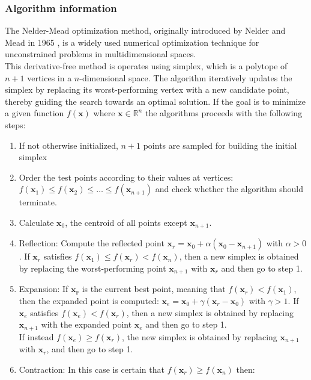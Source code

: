 \subsubsection{Algorithm information}
The Nelder-Mead optimization method, originally introduced by Nelder and Mead in 1965 \cite{NelderMeads}, is a widely used numerical optimization technique for unconstrained problems in multidimensional spaces. \\
This derivative-free method is operates using simplex, which is a polytope of $n+1$ vertices in a $n$-dimensional space.
The algorithm iteratively updates the simplex by replacing its worst-performing vertex with a new candidate point, thereby guiding the search towards an optimal solution. 
If the goal is to minimize a given function $f(\mathbf{x})$ where $\mathbf{x} \in \mathbb{R}^n$ the algorithms proceeds with the following steps:\begin{enumerate}
    \item If not otherwise initialized, $n+1$ points are sampled for building the initial simplex
    \item Order the test points according to their values at vertices: $f(\mathbf{x}_1) \leq f(\mathbf{x}_2) \leq \dots \leq f(\mathbf{x}_{n+1})$ and check whether the algorithm should terminate.
    \item Calculate $\mathbf{x}_0$, the centroid of all points except $\mathbf{x}_{n+1}$.
    \item Reflection: Compute the reflected point $\mathbf{x}_r = \mathbf{x}_0 + \alpha(\mathbf{x}_0 - \mathbf{x}_{n+1})$ with $\alpha > 0$. 
            If $\mathbf{x}_r$ satisfies $f(\mathbf{x}_1) \leq f(\mathbf{x}_r) < f(\mathbf{x}_n)$, then a new simplex is obtained by replacing the worst-performing point $\mathbf{x}_{n+1}$ with $\mathbf{x}_r$ and then go to step 1.
    \item Expansion: If $\mathbf{x_r}$ is the current best point, meaning that $f(\mathbf{x}_r) < f(\mathbf{x}_1)$, then the expanded point is computed: $\mathbf{x}_e = \mathbf{x}_0 + \gamma(\mathbf{x}_r-\mathbf{x}_0)$ with $\gamma>1$.
           If $\mathbf{x}_e$ satisfies $f(\mathbf{x}_e) < f(\mathbf{x}_r)$, then a new simplex is obtained by replacing $\mathbf{x}_{n+1}$ with the expanded point $\mathbf{x}_e$ and then go to step 1.\\
            If instead $f(\mathbf{x}_e) \geq f(\mathbf{x}_r)$, the new simplex is obtained by replacing $\mathbf{x}_{n+1}$ with $\mathbf{x}_r$, and then go to step 1.
    \item Contraction: In this case is certain that $f(\mathbf{x}_r) \geq f(\mathbf{x}_n)$ then:\begin{itemize}

\end{itemize}
\end{enumerate}
